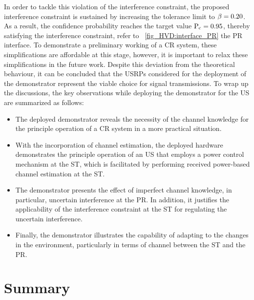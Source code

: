 In order to tackle this violation of the interference constraint, the proposed interference constraint is sustained by increasing the tolerance limit to $\beta = 0.20$. 
As a result, the confidence probability reaches the target value $\text{P}_{\text{c}} = 0.95$, thereby satisfying the interference constraint, refer to \figurename~\ref{fig_HVD:interface_PR} the PR interface. 
To demonstrate a preliminary working of a CR system, these simplifications are affordable at this stage, however, it is important to relax these simplifications in the future work. 
Despite this deviation from the theoretical behaviour, it can be concluded that the USRPs considered for the deployment of the demonstrator represent the viable choice for signal transmissions. To wrap up the discussions, the key observations while deploying the demonstrator for the US are summarized as follows: \begin{itemize} \item The deployed demonstrator reveals the necessity of the channel knowledge for the principle operation of a CR system in a more practical situation. \item With the incorporation of channel estimation, the deployed hardware demonstrates the principle operation of an US that employs a power control mechanism at the ST, which is facilitated by performing received power-based channel estimation at the ST. \item The demonstrator presents the effect of imperfect channel knowledge, in particular, uncertain interference at the PR. In addition, it justifies the applicability of the interference constraint at the ST for regulating the uncertain interference. 
\item Finally, the demonstrator illustrates the capability of adapting to the changes in the environment, particularly in terms of channel between the ST and the PR.  \end{itemize}

\section{Summary}
\label{con}

